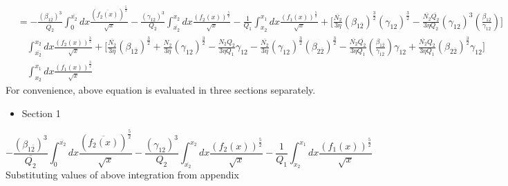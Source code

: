 \documentclass[fleqn, 10pt]{article}
\begin{document}
            \begin{equation}
            \begin{split}
            &= - \frac{(\beta_{1\overline{2}})^3}{\overline{Q_2}} \int^{\overline{x_2}}_0 dx \frac{(\overline{f_2(x)})^\frac{5}{2}}{\sqrt{x}} - \frac{(\gamma_{12})^3}{Q_2} \int^{x_2}_{\overline{x_2}} dx \frac{(f_2(x))^\frac{5}{2}}{\sqrt{x}} - \frac{1}{Q_1} \int^{x_1}_{x_2} dx \frac{(f_1(x))^\frac{5}{2}}{\sqrt{x}} + \Biggl[ \frac{\overline{N_2}}{3 \eta} (\beta_{1\overline{2}})^\frac{3}{2} (\gamma_{12})^\frac{3}{2} - \frac{\overline{N_2} \overline{Q_2}}{3 \eta Q_2} (\gamma_{12})^3 \left(\frac{\beta_{1\overline{2}}}{\gamma_{12}}\right) \Biggr] \\ & \quad \int^{x_2}_{\overline{x_2}} dx \frac{(f_2(x))^\frac{3}{2}}{\sqrt{x}} + \Biggl[ \frac{\overline{N_2}}{3 \eta} (\beta_{1\overline{2}})^\frac{3}{2} + \frac{N_2}{3 \eta} (\gamma_{12})^\frac{3}{2} - \frac{N_2 Q_2}{3 \eta Q_1} \gamma_{12} - \frac{\overline{N_2}}{3 \eta} (\gamma_{12})^\frac{3}{2} (\beta_{2\overline{2}})^\frac{3}{2} - \frac{\overline{N_2} \overline{Q_2}}{3 \eta Q_1} \left(\frac{\beta_{1\overline{2}}}{\gamma_{12}}\right) \gamma_{12} + \frac{\overline{N_2} Q_2}{3 \eta Q_1} (\beta_{2\overline{2}})^\frac{3}{2} \gamma_{12} \Biggr] \\ & \quad \int^{x_1}_{x_2} dx \frac{(f_1(x))^\frac{3}{2}}{\sqrt{x}} 
            \end{split}
            \label{95}
            \end{equation}
            For convenience, above equation is evaluated in three sections separately.
            \begin{itemize}
            \item Section 1
            \end{itemize}
            \begin{equation}
            - \frac{(\beta_{1\overline{2}})^3}{\overline{Q_2}} \int^{\overline{x_2}}_0 dx \frac{(\overline{f_2(x)})^\frac{5}{2}}{\sqrt{x}} - \frac{(\gamma_{12})^3}{Q_2} \int^{x_2}_{\overline{x_2}} dx \frac{(f_2(x))^\frac{5}{2}}{\sqrt{x}} - \frac{1}{Q_1} \int^{x_1}_{x_2} dx \frac{(f_1(x))^\frac{5}{2}}{\sqrt{x}}
            \label{96}
            \end{equation}
            Substituting values of above integration from appendix
\end{document}
